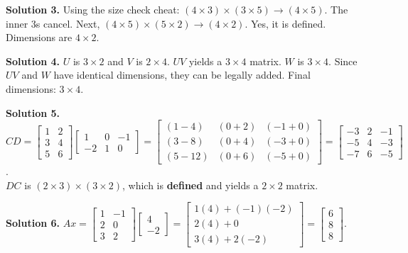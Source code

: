 \documentclass[11pt]{article}
\begin{document}
\vspace{0.2cm}\noindent\textbf{Solution 3.}
Using the size check cheat: $(4 \times 3) \times (3 \times 5) \rightarrow (4 \times 5)$. The inner 3s cancel. 
Next, $(4 \times 5) \times (5 \times 2) \rightarrow (4 \times 2)$. 
Yes, it is defined. Dimensions are \textbf{$4 \times 2$}.

\vspace{0.2cm}\noindent\textbf{Solution 4.}
$U$ is $3 \times 2$ and $V$ is $2 \times 4$. $UV$ yields a $3 \times 4$ matrix. 
$W$ is $3 \times 4$. Since $UV$ and $W$ have identical dimensions, they can be legally added. 
Final dimensions: \textbf{$3 \times 4$}.

\vspace{0.2cm}\noindent\textbf{Solution 5.}
$CD = \begin{bmatrix} 1 & 2 \\ 3 & 4 \\ 5 & 6 \end{bmatrix} \begin{bmatrix} 1 & 0 & -1 \\ -2 & 1 & 0 \end{bmatrix} = \begin{bmatrix} (1-4) & (0+2) & (-1+0) \\ (3-8) & (0+4) & (-3+0) \\ (5-12) & (0+6) & (-5+0) \end{bmatrix} = \begin{bmatrix} -3 & 2 & -1 \\ -5 & 4 & -3 \\ -7 & 6 & -5 \end{bmatrix}$.\\
$DC$ is $(2 \times 3) \times (3 \times 2)$, which is \textbf{defined} and yields a \textbf{$2 \times 2$} matrix.

\vspace{0.2cm}\noindent\textbf{Solution 6.}
$Ax = \begin{bmatrix} 1 & -1 \\ 2 & 0 \\ 3 & 2 \end{bmatrix} \begin{bmatrix} 4 \\ -2 \end{bmatrix} = \begin{bmatrix} 1(4) + (-1)(-2) \\ 2(4) + 0 \\ 3(4) + 2(-2) \end{bmatrix} = \begin{bmatrix} 6 \\ 8 \\ 8 \end{bmatrix}$.
\end{document}
